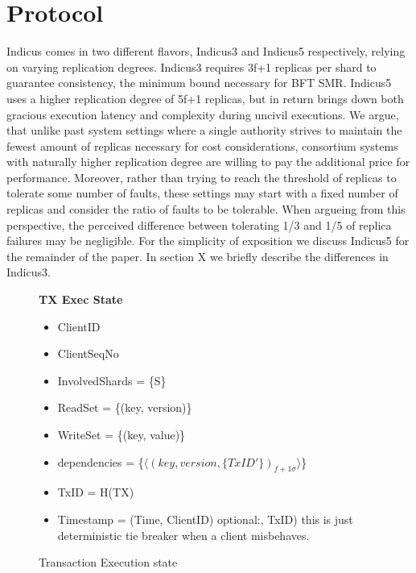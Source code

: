 
%
%
%
%
%
%
%
%

\section{Protocol}
Indicus comes in two different flavors, Indicus3 and Indicus5 respectively, relying on varying replication degrees. Indicus3 requires 3f+1 replicas per shard to guarantee consistency, the minimum bound necessary for BFT SMR. Indicus5 uses a higher replication degree of 5f+1 replicas, but in return brings down both gracious execution latency and complexity during uncivil executions. We argue, that unlike past system settings where a single authority strives to maintain the fewest amount of replicas necessary for cost considerations, consortium systems with naturally higher replication degree are willing to pay the additional price for performance. Moreover, rather than trying to reach the threshold of replicas to tolerate some number of faults, these settings may start with a fixed number of replicas and consider the ratio of faults to be tolerable. When argueing from this perspective, the perceived difference between tolerating 1/3 and 1/5 of replica failures may be negligible.
For the simplicity of exposition we discuss Indicus5 for the remainder of the paper. In section X we briefly describe the differences in Indicus3.


\begin{figure}[t]
  \begin{mdframed}[roundcorner=10pt]
 	\textbf{TX Exec State}
 	\begin{itemize}
 	\item ClientID
 	\item ClientSeqNo
 	\item InvolvedShards = \{S\}
 	\item ReadSet = \{(key, version)\}
 	\item WriteSet = \{(key, value)\}
 	\item dependencies = \{$\langle (key, version, \{TxID'\})_{f+1 \sigma} \rangle$\}
 	\item TxID = H(TX)
 	\item Timestamp = (Time, ClientID)  optional:, TxID) this is just deterministic tie breaker when a client misbehaves.
 	\end{itemize}
  \end{mdframed}
  \caption{Transaction Execution state}
  \label{fig:TX}
\end{figure}

